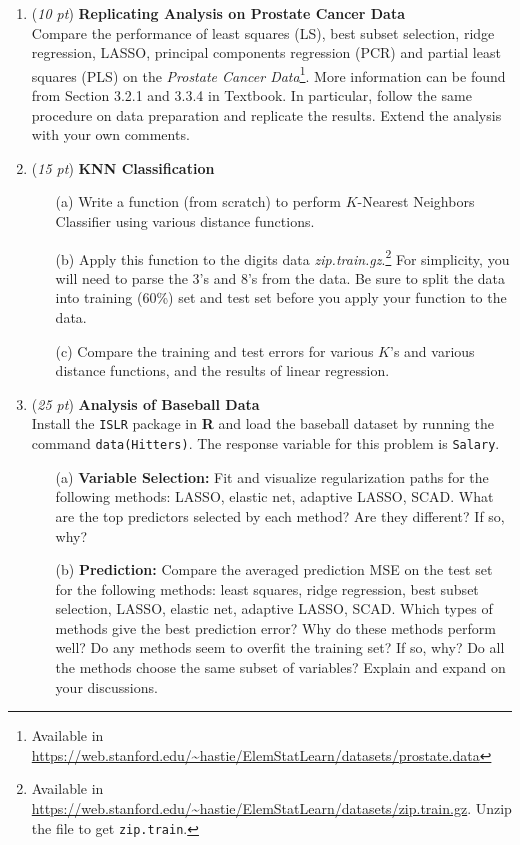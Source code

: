 \documentclass[10pt]{article}
\theoremstyle{definition}
\theoremstyle{remark}
\begin{document}
\begin{enumerate}
	\item (\textit{10 pt}) \textbf{Replicating Analysis on Prostate Cancer Data} \\ 
	Compare the performance of least squares (LS), best subset selection, ridge regression, LASSO, principal components regression (PCR) and partial least squares (PLS) on the \textit{Prostate Cancer Data}\footnote{Available in \url{https://web.stanford.edu/~hastie/ElemStatLearn/datasets/prostate.data}}. More information can be found from Section 3.2.1 and 3.3.4 in Textbook. In particular, follow the same procedure on data preparation and replicate the results. Extend the analysis with your own comments.
	
	\item (\textit{15 pt}) \textbf{KNN Classification}
	\begin{itemize}[leftmargin=*]
		\item [(a)] Write a function (from scratch) to perform $ K $-Nearest Neighbors Classifier using various distance
		functions.
		\item[(b)] Apply this function to the digits data {\it zip.train.gz}.\footnote{Available in \url{https://web.stanford.edu/~hastie/ElemStatLearn/datasets/zip.train.gz}. Unzip the file to get \texttt{zip.train}.} For
		simplicity, you will need to parse the 3's and 8's from the data. Be sure to split the data into training
		(60\%) set and test set before you apply your function to the data.
		\item[(c)] Compare the training and test errors for various $ K $'s and various distance functions, and the results of linear regression.
	\end{itemize}
	
	\item (\textit{25 pt}) {\bf Analysis of Baseball Data}\\
	Install the \texttt{ISLR} package in \textbf{R} and load the baseball dataset by running the command {\tt data(Hitters)}.
	The response variable for this problem is {\tt Salary}. 
	
	\begin{itemize}[leftmargin=*]
		\item [(a)] \textbf{Variable Selection:} Fit and visualize regularization paths for the following methods: LASSO, elastic net, adaptive LASSO, SCAD. What are the top predictors selected by each method? Are they different? If so, why?
		
		\item [(b)] \textbf{Prediction:} Compare the averaged prediction MSE on the test set for the following methods: least squares, ridge regression, best subset selection, LASSO, elastic net, adaptive LASSO, SCAD. Which types of methods give the best prediction error? Why do these methods perform well? Do any methods seem to overfit  the training set? If so, why? Do all the methods choose the same subset of variables? Explain and expand on your discussions.
	\end{itemize}
	

\end{enumerate}
\end{document}
